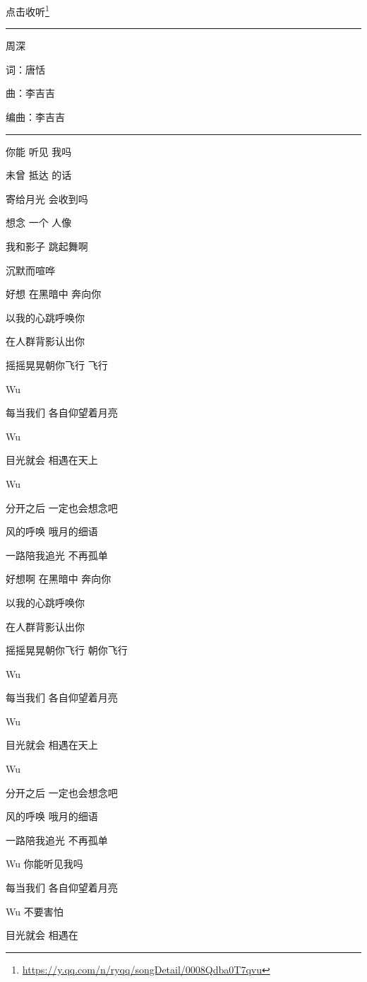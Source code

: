 \documentclass[]{ctexbook}
\renewcommand{\href}[2]{#2\footnote{\url{#1}}}
\begin{document}
\href{https://y.qq.com/n/ryqq/songDetail/0008Qdba0T7qvu}{点击收听}

\begin{center}\rule{0.5\linewidth}{0.5pt}\end{center}

周深

词：唐恬

曲：李吉吉

编曲：李吉吉

\begin{center}\rule{0.5\linewidth}{0.5pt}\end{center}

你能 听见 我吗

未曾 抵达 的话

寄给月光 会收到吗

想念 一个 人像

我和影子 跳起舞啊

沉默而喧哗

好想 在黑暗中 奔向你

以我的心跳呼唤你

在人群背影认出你

摇摇晃晃朝你飞行 飞行

Wu

每当我们 各自仰望着月亮

Wu

目光就会 相遇在天上

Wu

分开之后 一定也会想念吧

风的呼唤 哦月的细语

一路陪我追光 不再孤单

好想啊 在黑暗中 奔向你

以我的心跳呼唤你

在人群背影认出你

摇摇晃晃朝你飞行 朝你飞行

Wu

每当我们 各自仰望着月亮

Wu

目光就会 相遇在天上

Wu

分开之后 一定也会想念吧

风的呼唤 哦月的细语

一路陪我追光 不再孤单

Wu 你能听见我吗

每当我们 各自仰望着月亮

Wu 不要害怕

目光就会 相遇在
\end{document}
